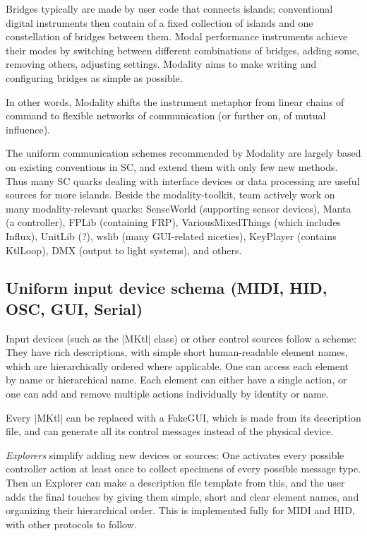 \documentclass{article}
\begin{document}
Bridges typically are made by user code that connects islands; conventional digital instruments then contain of a fixed collection of islands and one constellation of bridges between them. Modal performance instruments achieve their modes by switching between different combinations of bridges, adding some, removing others, adjusting settings. 
Modality aims to make writing and configuring bridges as simple as possible. 

In other words, Modality shifts the instrument metaphor from linear chains of command to flexible networks of communication (or further on, of mutual influence).

The uniform communication schemes recommended by Modality are largely based on existing conventions in SC, and extend them with only few new methods. Thus many SC quarks dealing with interface devices or data processing are useful sources for more islands. 
Beside the modality-toolkit\cite{githubmodality}, team actively work on many modality-relevant quarks: SenseWorld (supporting sensor devices), Manta (a controller), FPLib (containing FRP), VariousMixedThings (which includes Influx), UnitLib (?), wslib (many GUI-related niceties), KeyPlayer (contains KtlLoop), DMX (output to light systems), and others.

\subsection{ Uniform input device schema (MIDI, HID, OSC, GUI, Serial) }

Input devices (such as the |MKtl| class) or other control sources follow a scheme: 
They have rich descriptions, with simple short human-readable element names, which are hierarchically ordered where applicable. 
One can access each element by name or hierarchical name.
Each element can either have a single action, or one can add and remove multiple actions individually by identity or name.

Every |MKtl| can be replaced with a FakeGUI, which is made from its description file, and can generate all its control messages instead of the physical device.

\emph{Explorers} simplify adding new devices or sources: 
One activates every possible controller action at least once to collect specimens of every possible message type. 
Then an Explorer can make a description file template from this, and the user adds the final touches by giving them simple, short and clear element names, and organizing their hierarchical order. 
This is implemented fully for MIDI and HID, with other protocols to follow.
\end{document}
